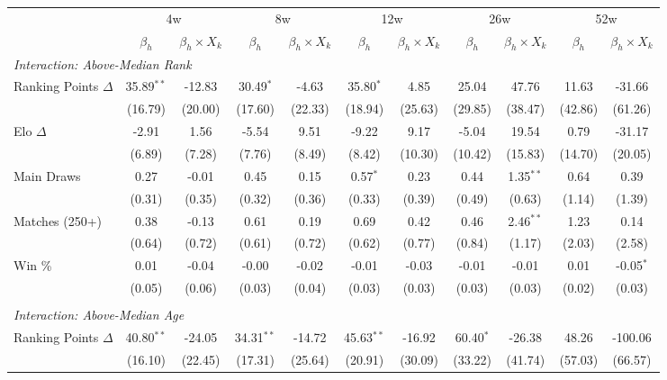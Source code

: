 \begin{tabular}{lcccccccccc}
\toprule
  & \multicolumn{2}{c}{4w} & \multicolumn{2}{c}{8w} & \multicolumn{2}{c}{12w} & \multicolumn{2}{c}{26w} & \multicolumn{2}{c}{52w} \\
\cmidrule(lr){2-3} \cmidrule(lr){4-5} \cmidrule(lr){6-7} \cmidrule(lr){8-9} \cmidrule(lr){10-11} 
  & $\beta_h$ & $\beta_h \times X_k$ & $\beta_h$ & $\beta_h \times X_k$ & $\beta_h$ & $\beta_h \times X_k$ & $\beta_h$ & $\beta_h \times X_k$ & $\beta_h$ & $\beta_h \times X_k$ \\
\midrule
\multicolumn{11}{l}{\textit{Interaction: Above-Median Rank}} \\
\quad Ranking Points $\Delta$ & 35.89$^{**}$ & -12.83 & 30.49$^{*}$ & -4.63 & 35.80$^{*}$ & 4.85 & 25.04 & 47.76 & 11.63 & -31.66 \\
 & (16.79) & (20.00) & (17.60) & (22.33) & (18.94) & (25.63) & (29.85) & (38.47) & (42.86) & (61.26) \\[0.3em]
\quad Elo $\Delta$ & -2.91 & 1.56 & -5.54 & 9.51 & -9.22 & 9.17 & -5.04 & 19.54 & 0.79 & -31.17 \\
 & (6.89) & (7.28) & (7.76) & (8.49) & (8.42) & (10.30) & (10.42) & (15.83) & (14.70) & (20.05) \\[0.3em]
\quad Main Draws & 0.27 & -0.01 & 0.45 & 0.15 & 0.57$^{*}$ & 0.23 & 0.44 & 1.35$^{**}$ & 0.64 & 0.39 \\
 & (0.31) & (0.35) & (0.32) & (0.36) & (0.33) & (0.39) & (0.49) & (0.63) & (1.14) & (1.39) \\[0.3em]
\quad Matches (250+) & 0.38 & -0.13 & 0.61 & 0.19 & 0.69 & 0.42 & 0.46 & 2.46$^{**}$ & 1.23 & 0.14 \\
 & (0.64) & (0.72) & (0.61) & (0.72) & (0.62) & (0.77) & (0.84) & (1.17) & (2.03) & (2.58) \\[0.3em]
\quad Win \% & 0.01 & -0.04 & -0.00 & -0.02 & -0.01 & -0.03 & -0.01 & -0.01 & 0.01 & -0.05$^{*}$ \\
 & (0.05) & (0.06) & (0.03) & (0.04) & (0.03) & (0.03) & (0.03) & (0.03) & (0.02) & (0.03) \\[0.3em]
\\[0.3em]
\multicolumn{11}{l}{\textit{Interaction: Above-Median Age}} \\
\quad Ranking Points $\Delta$ & 40.80$^{**}$ & -24.05 & 34.31$^{**}$ & -14.72 & 45.63$^{**}$ & -16.92 & 60.40$^{*}$ & -26.38 & 48.26 & -100.06 \\
 & (16.10) & (22.45) & (17.31) & (25.64) & (20.91) & (30.09) & (33.22) & (41.74) & (57.03) & (66.57) \\[0.3em]

\end{tabular}
